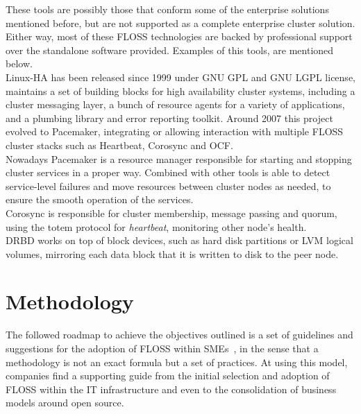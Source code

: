 \documentclass[a4paper, 12pt]{book}
\begin{document}
These tools are possibly those that conform some of the enterprise solutions mentioned before, but are not supported as a complete enterprise cluster solution. Either way, most of these FLOSS technologies are backed by professional support over the standalone software provided. Examples of this tools, are mentioned below.\\

\noindent Linux-HA has been released since 1999 under GNU GPL and GNU LGPL license, maintains a set of building blocks for high availability cluster systems, including a cluster messaging layer, a bunch of resource agents for a variety of applications, and a plumbing library and error reporting toolkit. Around 2007 this project evolved to Pacemaker, integrating or allowing interaction with multiple FLOSS cluster stacks such as Heartbeat, Corosync and OCF.\\

\noindent Nowadays Pacemaker is a resource manager responsible for starting and stopping cluster services in a proper way. Combined with other tools is able to detect service-level failures and move resources between cluster nodes as needed, to ensure the smooth operation of the services.\\

\noindent Corosync is responsible for cluster membership, message passing and quorum, using the totem protocol 
for \textit{heartbeat}, monitoring other node's health.\\

\noindent DRBD works on top of block devices, such as hard disk partitions or LVM logical volumes, mirroring each data block that it is written to disk to the peer node. 


%
\chapter{Methodology}
\label{chap:methodology}

The followed roadmap to achieve the objectives outlined is a set of guidelines and suggestions for the adoption of FLOSS within SMEs~\cite{Daffara SME}, in the sense that a methodology is not an exact formula but a set of practices. At using this model, companies find a supporting guide from the initial selection and adoption of FLOSS within the IT infrastructure and even to the consolidation of business models around open source.\\
\end{document}
